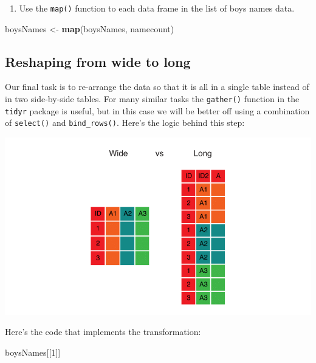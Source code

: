 \documentclass[
]{book}
\newenvironment{Shaded}{\begin{snugshade}}{\end{snugshade}}
\newcommand{\DecValTok}[1]{\textcolor[rgb]{0.00,0.00,0.81}{#1}}
\newcommand{\KeywordTok}[1]{\textcolor[rgb]{0.13,0.29,0.53}{\textbf{#1}}}
\newcommand{\NormalTok}[1]{#1}
\newcommand{\StringTok}[1]{\textcolor[rgb]{0.31,0.60,0.02}{#1}}
\providecommand{\tightlist}{%
  \setlength{\itemsep}{0pt}\setlength{\parskip}{0pt}}
\begin{document}
\begin{alert}
\begin{enumerate}
\def\labelenumi{\arabic{enumi}.}
\setcounter{enumi}{2}
\tightlist
\item
  Use the \texttt{map()} function to each data frame in the list of boys names data.
\end{enumerate}

\begin{Shaded}
\begin{Highlighting}[]
\NormalTok{  boysNames \textless{}{-}}\StringTok{ }\KeywordTok{map}\NormalTok{(boysNames, namecount)}
\end{Highlighting}
\end{Shaded}

\end{alert}

\hypertarget{reshaping-from-wide-to-long}{%
\subsection{Reshaping from wide to long}\label{reshaping-from-wide-to-long}}

Our final task is to re-arrange the data so that it is all in a single
table instead of in two side-by-side tables. For many similar tasks
the \texttt{gather()} function in the \texttt{tidyr} package is useful, but in this
case we will be better off using a combination of \texttt{select()} and
\texttt{bind\_rows()}. Here's the logic behind this step:

\includegraphics{R/RDataWrangling/images/wide_vs_long.png}

Here's the code that implements the transformation:

\begin{Shaded}
\begin{Highlighting}[]
\NormalTok{boysNames[[}\DecValTok{1}\NormalTok{]]}
\end{Highlighting}
\end{Shaded}
\end{document}
